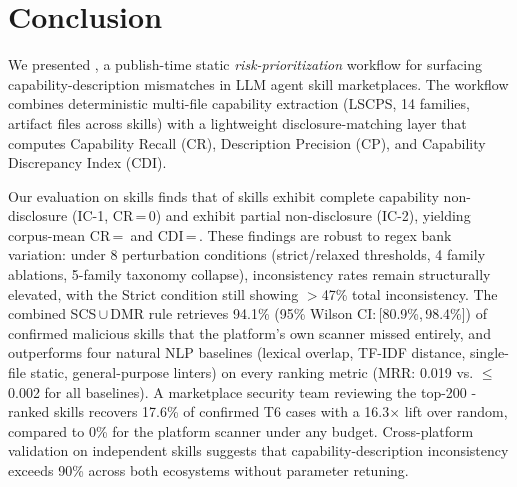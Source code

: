 
\section{Conclusion}
\label{sec:conclusion}

We presented \sysname, a publish-time static \emph{risk-prioritization} workflow for
surfacing capability-description mismatches in LLM agent skill marketplaces.
The workflow combines deterministic multi-file capability extraction (LSCPS,
14 families, \ResultFilesRead{} artifact files across \NskillsDMR{} skills)
with a lightweight disclosure-matching layer that computes Capability Recall
(CR), Description Precision (CP), and Capability Discrepancy Index (CDI).

Our evaluation on \NskillsDMR{} \clawhub{} skills finds that
\ResultICone{} of skills exhibit complete capability non-disclosure (IC-1,
CR\,=\,0) and \ResultICtwo{} exhibit partial non-disclosure (IC-2),
yielding corpus-mean CR\,=\,\ResultCR{} and CDI\,=\,\ResultCDI{}.
These findings are robust to regex bank variation: under 8 perturbation conditions
(strict/relaxed thresholds, 4 family ablations, 5-family taxonomy collapse),
inconsistency rates remain structurally elevated, with the Strict condition
still showing $>$47\% total inconsistency.
The combined SCS\,$\cup$\,DMR rule retrieves 94.1\%
(95\% Wilson CI:\,[80.9\%,\,98.4\%]) of \Nmalicious{} confirmed malicious skills
that the platform's own scanner missed entirely,
and outperforms four natural NLP baselines (lexical overlap, TF-IDF distance,
single-file static, general-purpose linters) on every ranking metric
(MRR: 0.019 vs. $\leq$0.002 for all baselines).
A marketplace security team reviewing the top-200 \sysname-ranked skills
recovers 17.6\% of confirmed T6 cases with a 16.3$\times$ lift over random,
compared to 0\% for the platform scanner under any budget.
Cross-platform validation on \NskillsSH{} independent skills suggests
that capability-description inconsistency exceeds 90\%
across both ecosystems without parameter retuning.

